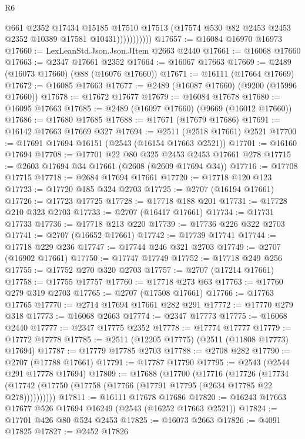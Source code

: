 \begin{lexlean}{R6}
\begin{coremodule}
                        @661
                        @2352
                        @17434
                        @15185
                        @17510
                        @17513
                        (@17574 @530 @82 @2453 @2453 @2352 @10389 @17581 @10431)))))))))))
@17657 := @16084 @16970 @16973
@17660 := LexLeanStd.Json.Json.JItem @2663 @2440
@17661 := @16068 @17660
@17663 := @2347 @17661 @2352
@17664 := @16067 @17663
@17669 := @2489 (@16073 @17660) (@88 (@16076 @17660))
@17671 := @16111 (@17664 @17669)
@17672 := @16085 @17663
@17677 := @2489 (@16087 @17660) (@9200 (@15996 @17660))
@17678 := @17672 @17677
@17679 := @16084 @17678
@17680 := @16095 @17663
@17685 := @2489 (@16097 @17660) (@9669 (@16012 @17660))
@17686 := @17680 @17685
@17688 := @17671 (@17679 @17686)
@17691 := @16142 @17663 @17669 @327
@17694 := @2511 (@2518 @17661) @2521
@17700 := @17691 @17694 @16151 (@2543 (@16154 @17663 @2521))
@17701 := @16160 @17694
@17708 := @17701 @22 @80 @325 @2453 @2453 @17661 @278
@17715 := @2603 @17694 @34 @17661 (@2608 (@2609 @17694 @34))
@17716 := @17708 @17715
@17718 := @2684 @17694 @17661
@17720 := @17718 @120 @123
@17723 := @17720 @185 @324 @2703
@17725 := @2707 (@16194 @17661)
@17726 := @17723 @17725
@17728 := @17718 @188 @201
@17731 := @17728 @210 @323 @2703
@17733 := @2707 (@16417 @17661)
@17734 := @17731 @17733
@17736 := @17718 @213 @220
@17739 := @17736 @226 @322 @2703
@17741 := @2707 (@16652 @17661)
@17742 := @17739 @17741
@17744 := @17718 @229 @236
@17747 := @17744 @246 @321 @2703
@17749 := @2707 (@16902 @17661)
@17750 := @17747 @17749
@17752 := @17718 @249 @256
@17755 := @17752 @270 @320 @2703
@17757 := @2707 (@17214 @17661)
@17758 := @17755 @17757
@17760 := @17718 @273 @63
@17763 := @17760 @279 @319 @2703
@17765 := @2707 (@17508 @17661)
@17766 := @17763 @17765
@17770 := @2714 @17694 @17661 @282 @291
@17772 := @17770 @279 @318
@17773 := @16068 @2663
@17774 := @2347 @17773
@17775 := @16068 @2440
@17777 := @2347 @17775 @2352
@17778 := @17774 @17777
@17779 := @17772 @17778
@17785 := @2511 (@12205 @17775) (@2511 (@11808 @17773) @17694)
@17787 := @17779 @17785 @2703
@17788 := @2708 @282
@17790 := @2707 (@17788 @17661)
@17791 := @17787 @17790
@17795 := @2543 (@2544 @291 @17778 @17694)
@17809 := @17688
    (@17700
      (@17716
        (@17726
          (@17734 (@17742 (@17750 (@17758 (@17766 (@17791 @17795 (@2634 @17785 @22 @278))))))))))
@17811 := @16111 @17678 @17686
@17820 := @16243 @17663 @17677 @526 @17694 @16249 (@2543 (@16252 @17663 @2521))
@17824 := @17701 @426 @80 @524 @2453
@17825 := @16073 @2663
@17826 := @4091 @17825
@17827 := @2452 @17826

\end{coremodule}
\end{lexlean}
